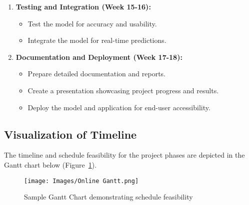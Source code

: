 \begin{enumerate}
    \item \textbf{Testing and Integration (Week 15-16):}
    \begin{itemize}
        \item Test the model for accuracy and usability.
        \item Integrate the model for real-time predictions.
    \end{itemize}
    
    \item \textbf{Documentation and Deployment (Week 17-18):}
    \begin{itemize}
        \item Prepare detailed documentation and reports.
        \item Create a presentation showcasing project progress and results.
        \item Deploy the model and application for end-user accessibility.
    \end{itemize}
\end{enumerate}


\subsection{Visualization of Timeline}
The timeline and schedule feasibility for the project phases are depicted in the Gantt chart below (Figure~\ref{fig:gantt-chart}).

\begin{figure}[H]
    \centering
    \texttt{[image: Images/Online Gantt.png]}
    \caption{Sample Gantt Chart demonstrating schedule feasibility}
    \label{fig:gantt-chart}
\end{figure}
